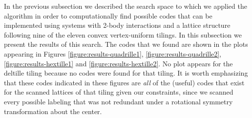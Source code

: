 \documentclass[12pt]{amsbook}
\theoremstyle{plain}
\theoremstyle{definition}
\theoremstyle{remark}
\begin{document}
In the previous subsection we described the search space to which we applied the algorithm in order to computationally find possible codes that can be implemented using systems with 2-body interactions and a lattice structure following nine of the eleven convex vertex-uniform tilings.  In this subsection we present the results of this search.  The codes that we found are shown in the plots appearing in Figures \ref{figure:results-quadrille1}, \ref{figure:results-quadrille2}, \ref{figure:results-hextille1} and \ref{figure:results-hextille2}.  No plot appears for the deltille tiling because no codes were found for that tiling.  It is worth emphasizing that these codes indicated in these figures are \emph{all} of the (useful) codes that exist for the scanned lattices of that tiling given our constraints, since we scanned every possible labeling that was not redundant under a rotational symmetry transformation about the center.
\end{document}
